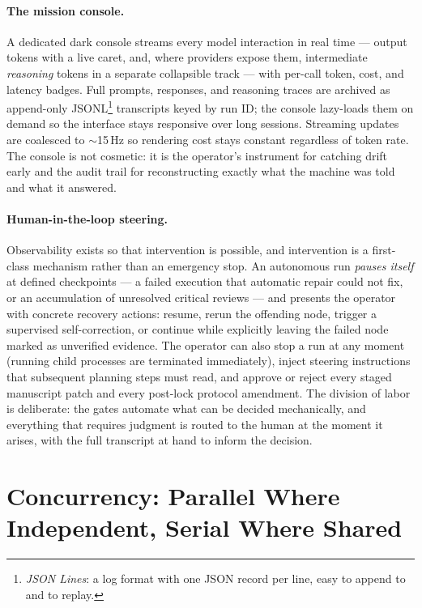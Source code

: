 \documentclass[11pt]{article}
\begin{document}
\paragraph{The mission console.}
A dedicated dark console streams every model interaction in real time --- output tokens with a live caret, and, where providers expose them, intermediate \emph{reasoning} tokens in a separate collapsible track --- with per-call token, cost, and latency badges. Full prompts, responses, and reasoning traces are archived as append-only JSONL\footnote{\emph{JSON Lines}: a log format with one JSON record per line, easy to append to and to replay.} transcripts keyed by run ID; the console lazy-loads them on demand so the interface stays responsive over long sessions. Streaming updates are coalesced to $\sim$15\,Hz so rendering cost stays constant regardless of token rate. The console is not cosmetic: it is the operator's instrument for catching drift early and the audit trail for reconstructing exactly what the machine was told and what it answered.

\paragraph{Human-in-the-loop steering.}
Observability exists so that intervention is possible, and intervention is a first-class mechanism rather than an emergency stop. An autonomous run \emph{pauses itself} at defined checkpoints --- a failed execution that automatic repair could not fix, or an accumulation of unresolved critical reviews --- and presents the operator with concrete recovery actions: resume, rerun the offending node, trigger a supervised self-correction, or continue while explicitly leaving the failed node marked as unverified evidence. The operator can also stop a run at any moment (running child processes are terminated immediately), inject steering instructions that subsequent planning steps must read, and approve or reject every staged manuscript patch and every post-lock protocol amendment. The division of labor is deliberate: the gates automate what can be decided mechanically, and everything that requires judgment is routed to the human at the moment it arises, with the full transcript at hand to inform the decision.

\section{Concurrency: Parallel Where Independent, Serial Where Shared}
\label{sec:concurrency}
\end{document}
